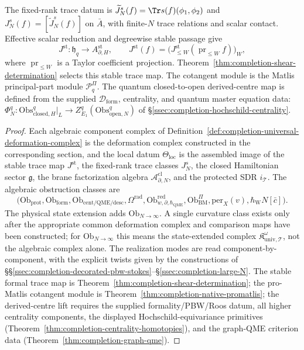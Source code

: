 \begin{thm}
The fixed-rank trace datum is
\(\widetilde J_N^s(f)=\Tr s(f)(\phi_1,\phi_2)\) and
\(J_N^s(f)=[\widetilde J_N^s(f)]\) on \(\bar A\),
with finite-\(N\) trace relations and scalar contact.  Effective
scalar reduction and degreewise stable passage give
\[
  J^{\mathrm{st}}\colon\mathfrak h_q\longrightarrow
  A_{\partial,H}^{\mathrm{st}},
  \qquad
  J^{\mathrm{st}}(f)
  =\bigl(J^{\mathrm{st}}_{\leq W}
    (\operatorname{pr}_{\leq W}f)\bigr)_W,
\]
where \(\operatorname{pr}_{\leq W}\) is a Taylor coefficient
projection.  Theorem~\ref{thm:completion-shear-determination}
selects this stable trace map.  The cotangent module is the Matlis
principal-part module \(\mathcal P^\Pi_q\).  The quantum
closed-to-open derived-centre map is defined from the supplied
\(\mathcal D_{\mathrm{form}}\), centrality, and quantum master
equation data:
\(\Phi^q_N:\mathrm{Obs}^q_{\mathrm{closed},H}|_L\to
Z^q_{E_1}(\mathrm{Obs}^q_{\mathrm{open},N})\) of
\S\ref{ssec:completion-hochschild-centrality}.
\end{thm}

\begin{proof}
Each algebraic component complex of
Definition~\ref{def:completion-universal-deformation-complex} is
the deformation complex constructed in the corresponding section,
and the local datum \(\Theta_{\mathrm{loc}}\) is the assembled image
of the stable trace map \(J^{\mathrm{st}}\), the fixed-rank trace
classes \(J_N^s\), the closed Hamiltonian sector
\(\mathfrak g\), the brane factorization algebra
\(\mathcal A^{\mathrm{cl}}_{\partial,N}\), and the protected SDR
\(i_{\mathcal T}\).  The algebraic obstruction classes are
\[
\bigl(\mathrm{Ob}_{\mathrm{prot}},\mathrm{Ob}_{\mathrm{form}},
\mathrm{Ob}_{\mathrm{cent/QME/desc}},
\Omega^{\mathrm{rad}},\mathrm{Ob}^{\mathrm{red}}_{w,\partial,\hbar_{\mathrm{QME}}},
\mathrm{Ob}^\Pi_{\mathrm{BM}},\mathrm{per}_X(v),
\hbar_{\mathrm{W}}N[\bar c]\bigr).
\]
The physical state extension adds
\(\mathrm{Ob}_{N\to\infty}\).  A single curvature class exists only
after the appropriate common deformation complex and comparison maps
have been constructed; for \(\mathrm{Ob}_{N\to\infty}\) this means the
state-extended complex
\(\mathfrak K^\omega_{\mathrm{univ},\mathcal T}\), not the algebraic
complex alone.  The realization modes are read component-by-component,
with the explicit twists given by the
constructions of \S\S\ref{ssec:completion-decorated-pbw-stokes}--\S\ref{ssec:completion-large-N}.
The stable formal trace map is
Theorem~\ref{thm:completion-shear-determination}; the pro-Matlis
cotangent module is Theorem~\ref{thm:completion-native-promatlis};
the derived-centre lift requires the supplied formality/PBW/Roos
datum, all higher centrality components, the displayed
Hochschild-equivariance primitives
(Theorem~\ref{thm:completion-centrality-homotopies}), and the
graph-QME criterion data
(Theorem~\ref{thm:completion-graph-qme}).
\end{proof}

